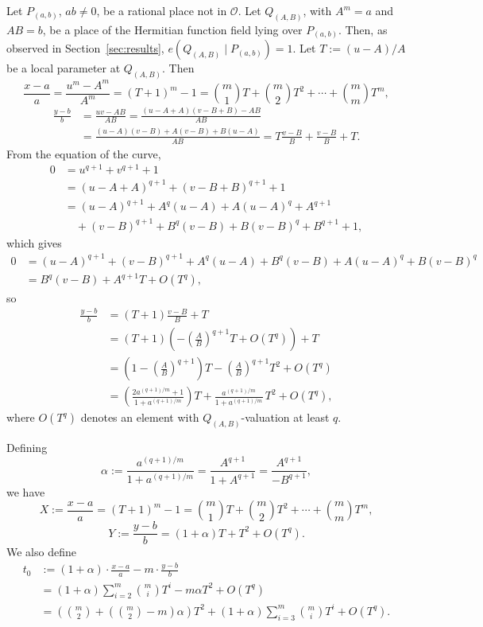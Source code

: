 \documentclass[12pt]{amsart}
\theoremstyle{remark}
\theoremstyle{definition}
\newcommand{\coloneqq}{\mathrel{:=}}
\begin{document}
Let $P_{(a,b)}$, $ab \neq 0$, be a rational place not in $\mathcal{O}$. Let
$Q_{(A,B)}$, with $A^{m} = a$ and $AB = b$, be a place of the Hermitian
function field lying over $P_{(a,b)}$. Then, as observed in
Section~\ref{sec:results}, $e\!\left(Q_{(A,B)} \mid P_{(a,b)}\right) = 1$.
Let $T \coloneqq (u-A)/A$ be a local parameter at $Q_{(A,B)}$. Then
$$\frac{x-a}{a} = \frac{u^{m}-A^{m}}{A^{m}}
  = (T+1)^{m} - 1
  = \binom{m}{1}T + \binom{m}{2}T^{2} + \cdots + \binom{m}{m}T^{m},$$
\begin{align*}
    \frac{y-b}{b}
    &= \frac{uv - AB}{AB}
     = \frac{(u-A+A)(v-B+B) - AB}{AB} \\
    &= \frac{(u-A)(v-B) + A(v-B) + B(u-A)}{AB}
     = T\frac{v-B}{B} + \frac{v-B}{B} + T.
\end{align*}
From the equation of the curve,
\begin{align*}
    0 &= u^{q+1} + v^{q+1} + 1 \\
      &= (u-A+A)^{q+1} + (v-B+B)^{q+1} + 1 \\
      &= (u-A)^{q+1} + A^{q}(u-A) + A(u-A)^{q} + A^{q+1} \\
      &\quad + (v-B)^{q+1} + B^{q}(v-B) + B(v-B)^{q} + B^{q+1} + 1,
\end{align*}
which gives
\begin{align*}
    0 &= (u-A)^{q+1} + (v-B)^{q+1} + A^{q}(u-A) + B^{q}(v-B)
         + A(u-A)^{q} + B(v-B)^{q} \\
      &= B^{q}(v-B) + A^{q+1}T + O\!\left(T^{q}\right),
\end{align*}
so
\begin{align*}
    \frac{y-b}{b}
    &= (T+1)\frac{v-B}{B} + T \\
    &= (T+1)\left(-\left(\frac{A}{B}\right)^{q+1}T + O\!\left(T^{q}\right)\right) + T \\
    &= \left(1 - \left(\frac{A}{B}\right)^{q+1}\right)T
       - \left(\frac{A}{B}\right)^{q+1}T^{2} + O\!\left(T^{q}\right) \\
    &= \left(\frac{2a^{(q+1)/m}+1}{1+a^{(q+1)/m}}\right)T
       + \frac{a^{(q+1)/m}}{1+a^{(q+1)/m}}\,T^{2} + O\!\left(T^{q}\right),
\end{align*}
where $O(T^{q})$ denotes an element with $Q_{(A,B)}$-valuation at least $q$.

Defining
\[
    \alpha \coloneqq \frac{a^{(q+1)/m}}{1+a^{(q+1)/m}}
    = \frac{A^{q+1}}{1+A^{q+1}} = \frac{A^{q+1}}{-B^{q+1}},
\]
we have
\[
    X \coloneqq \frac{x-a}{a} = (T+1)^{m} - 1
    = \binom{m}{1}T + \binom{m}{2}T^{2} + \cdots + \binom{m}{m}T^{m},
\]
\[
    Y \coloneqq \frac{y-b}{b} = (1+\alpha)T + T^{2} + O\!\left(T^{q}\right).
\]
We also define
\begin{align*}
    t_0 &\coloneqq (1+\alpha)\cdot\frac{x-a}{a} - m\cdot\frac{y-b}{b} \\
        &= (1+\alpha)\sum_{i=2}^{m}\binom{m}{i}T^{i}
           - m\alpha T^{2} + O\!\left(T^{q}\right) \\
        &= \left(\binom{m}{2} + \left(\binom{m}{2}-m\right)\alpha\right)T^{2}
           + (1+\alpha)\sum_{i=3}^{m}\binom{m}{i}T^{i}
           + O\!\left(T^{q}\right).
\end{align*}
\end{document}
